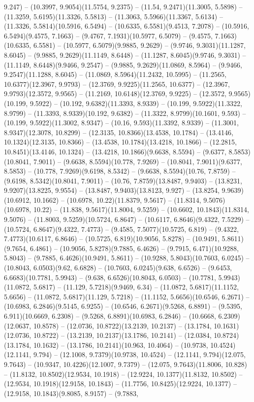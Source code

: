 9.247) -- (10.3997, 9.9054)(11.5754, 9.2375) -- (11.54, 9.2471)(11.3005, 5.5898) -- (11.3259, 5.6195)(11.3326, 5.5813) -- (11.3063, 5.5966)(11.3367, 5.6134) -- (11.3326, 5.5814)(10.5916, 6.5494) -- (10.6335, 6.5581)(9.4513, 7.2078) -- (10.5916, 6.5494)(9.4575, 7.1663) -- (9.4767, 7.1931)(10.5977, 6.5079) -- (9.4575, 7.1663)(10.6335, 6.5581) -- (10.5977, 6.5079)(9.9885, 9.2629) -- (9.9746, 9.3031)(11.1287, 8.6045) -- (9.9885, 9.2629)(11.1149, 8.6448) -- (11.1287, 8.6045)(9.9746, 9.3031) -- (11.1149, 8.6448)(9.9466, 9.2547) -- (9.9885, 9.2629)(11.0869, 8.5964) -- (9.9466, 9.2547)(11.1288, 8.6045) -- (11.0869, 8.5964)(11.2432, 10.5995) -- (11.2565, 10.6377)(12.3967, 9.9793) -- (12.3769, 9.9225)(11.2565, 10.6377) -- (12.3967, 9.9793)(12.3572, 9.9565) -- (11.2169, 10.6148)(12.3769, 9.9225) -- (12.3572, 9.9565)(10.199, 9.5922) -- (10.192, 9.6382)(11.3393, 8.9339) -- (10.199, 9.5922)(11.3322, 8.9799) -- (11.3393, 8.9339)(10.192, 9.6382) -- (11.3322, 8.9799)(10.1601, 9.593) -- (10.199, 9.5922)(11.3002, 8.9347) -- (10.16, 9.593)(11.3392, 8.9339) -- (11.3001, 8.9347)(12.3078, 10.8299) -- (12.3135, 10.8366)(13.4538, 10.1784) -- (13.4146, 10.1324)(12.3135, 10.8366) -- (13.4538, 10.1784)(13.4218, 10.1866) -- (12.2815, 10.8451)(13.4146, 10.1324) -- (13.4218, 10.1866)(9.6638, 8.5594) -- (9.6377, 8.5853)(10.8041, 7.9011) -- (9.6638, 8.5594)(10.778, 7.9269) -- (10.8041, 7.9011)(9.6377, 8.5853) -- (10.778, 7.9269)(9.6198, 8.5342) -- (9.6638, 8.5594)(10.76, 7.8759) -- (9.6198, 8.5342)(10.8041, 7.9011) -- (10.76, 7.8759)(13.8487, 9.9403) -- (13.8231, 9.9207)(13.8225, 9.9554) -- (13.8487, 9.9403)(13.8123, 9.927) -- (13.8254, 9.9639)(10.6912, 10.1662) -- (10.6978, 10.22)(11.8379, 9.5617) -- (11.8314, 9.5076)(10.6978, 10.22) -- (11.838, 9.5617)(11.8004, 9.5259) -- (10.6602, 10.1843)(11.8314, 9.5076) -- (11.8003, 9.5259)(10.5724, 6.8647) -- (10.6117, 6.8646)(9.4322, 7.5229) -- (10.5724, 6.8647)(9.4322, 7.4773) -- (9.4585, 7.5077)(10.5725, 6.819) -- (9.4322, 7.4773)(10.6117, 6.8646) -- (10.5725, 6.819)(10.9056, 5.8278) -- (10.9491, 5.8611)(9.7654, 6.4861) -- (10.9056, 5.8278)(9.7885, 6.4626) -- (9.7915, 6.471)(10.9288, 5.8043) -- (9.7885, 6.4626)(10.9491, 5.8611) -- (10.9288, 5.8043)(10.7603, 6.0245) -- (10.8043, 6.0503)(9.62, 6.6828) -- (10.7603, 6.0245)(9.638, 6.6526) -- (9.6453, 6.6683)(10.7781, 5.9943) -- (9.638, 6.6526)(10.8043, 6.0503) -- (10.7781, 5.9943)(11.0872, 5.6817) -- (11.129, 5.7218)(9.9469, 6.34) -- (11.0872, 5.6817)(11.1152, 5.6656) -- (11.0872, 5.6817)(11.129, 5.7218) -- (11.1152, 5.6656)(10.6546, 6.2671) -- (10.6983, 6.2846)(9.5145, 6.9255) -- (10.6546, 6.2671)(9.5268, 6.8891) -- (9.5395, 6.911)(10.6669, 6.2308) -- (9.5268, 6.8891)(10.6983, 6.2846) -- (10.6668, 6.2309)(12.0637, 10.8578) -- (12.0736, 10.8722)(13.2139, 10.2137) -- (13.1784, 10.1631)(12.0736, 10.8722) -- (13.2139, 10.2137)(13.1786, 10.2141) -- (12.0384, 10.8724)(13.1784, 10.1632) -- (13.1786, 10.2141)(10.963, 10.4064) -- (10.9738, 10.4524)(12.1141, 9.794) -- (12.1008, 9.7379)(10.9738, 10.4524) -- (12.1141, 9.794)(12.075, 9.7643) -- (10.9347, 10.4226)(12.1007, 9.7379) -- (12.075, 9.7643)(11.8006, 10.828) -- (11.8132, 10.8502)(12.9534, 10.1918) -- (12.9224, 10.1377)(11.8132, 10.8502) -- (12.9534, 10.1918)(12.9158, 10.1843) -- (11.7756, 10.8425)(12.9224, 10.1377) -- (12.9158, 10.1843)(9.8085, 8.9157) -- (9.7883, 